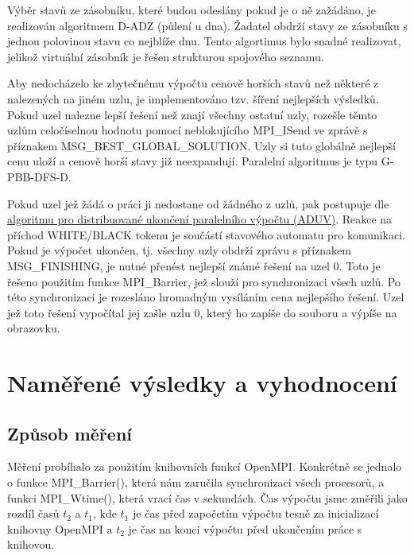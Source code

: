 \documentclass[12pt]{article}
\begin{document}
Výběr stavů ze zásobníku, které budou odeslány pokud je o ně zažádáno, je realizován algoritmem D-ADZ (půlení u dna). Žadatel obdrží stavy ze zásobníku s jednou polovinou stavu co nejblíže dnu. Tento algortimus bylo snadné realizovat, jelikož virtuální zásobník je řešen strukturou spojového seznamu.

Aby nedocházelo ke zbytečnému výpočtu cenově horších stavů než některé z nalezených na jiném uzlu, je implementováno tzv. šíření nejlepších výsledků. Pokud uzel nalezne lepší řešení než znají všechny ostatní uzly, rozešle těmto uzlům celočíselnou hodnotu pomocí neblokujícího MPI\_ISend ve zprávě s příznakem MSG\_BEST\_GLOBAL\_SOLUTION. Uzly si tuto globálně nejlepší cenu uloží a cenově horší stavy již neexpandují. Paralelní algoritmus je typu G-PBB-DFS-D.

Pokud uzel jež žádá o práci ji nedostane od žádného z uzlů, pak postupuje dle \href{https://edux.fit.cvut.cz/courses/MI-PAR/labs/prohledavani_do_hloubky#algoritmus_pro_distribuovane_ukonceni_paralelniho_vypoctu_aduv}{algoritmu pro distribuované ukončení paralelního výpočtu (ADUV)}. Reakce na příchod WHITE/BLACK tokenu je součástí stavového automatu pro komunikaci. Pokud je výpočet ukončen, tj. všechny uzly obdrží zprávu s příznakem MSG\_FINISHING, je nutné přenést nejlepší známé řešení na uzel 0. Toto je řešeno použitím funkce MPI\_Barrier, jež slouží pro synchronizaci všech uzlů. Po této synchronizaci je rozesláno hromadným vysíláním cena nejlepšího řešení. Uzel jež toto řešení vypočítal jej zašle uzlu 0, který ho zapíše do souboru a výpíše na obrazovku. 

\section{Naměřené výsledky a vyhodnocení}
\subsection{Způsob měření}
Měření probíhalo za použitím knihovních funkcí OpenMPI. Konkrétně se jednalo o funkce MPI\_Barrier(), 
která nám zaručila synchronizaci všech procesorů, a funkci MPI\_Wtime(), která vrací čas v sekundách.
Čas výpočtu jsme změřili jako rozdíl časů \(t_2\) a \(t_1\), kde \(t_1\) je čas před započetím výpočtu
tesně za inicializací knihovny OpenMPI a \(t_2\) je čas na konci výpočtu před ukončením práce s knihovou.
\end{document}
